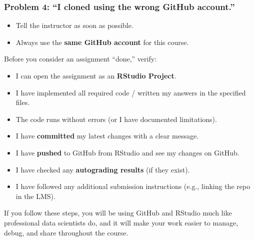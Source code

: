 \documentclass[11pt]{scrartcl}
\begin{document}
\begin{warningBox}
\subsubsection*{Problem 4: ``I cloned using the wrong GitHub account.''}
\begin{itemize}[nosep]
  \item Tell the instructor as soon as possible.
  \item Always use the \textbf{same GitHub account} for this course.
\end{itemize}

\end{warningBox}

\begin{checklistBox}

Before you consider an assignment ``done,'' verify:

\begin{itemize}[leftmargin=2em]
  \item[\Square] I can open the assignment as an \textbf{RStudio Project}.
  \item[\Square] I have implemented all required code / written my answers in the specified files.
  \item[\Square] The code runs without errors (or I have documented limitations).
  \item[\Square] I have \textbf{committed} my latest changes with a clear message.
  \item[\Square] I have \textbf{pushed} to GitHub from RStudio and see my changes on GitHub.
  \item[\Square] I have checked any \textbf{autograding results} (if they exist).
  \item[\Square] I have followed any additional submission instructions (e.g., linking the repo in the LMS).
\end{itemize}

If you follow these steps, you will be using GitHub and RStudio much like professional data scientists do, and it will make your work easier to manage, debug, and share throughout the course.

\end{checklistBox}
\end{document}
